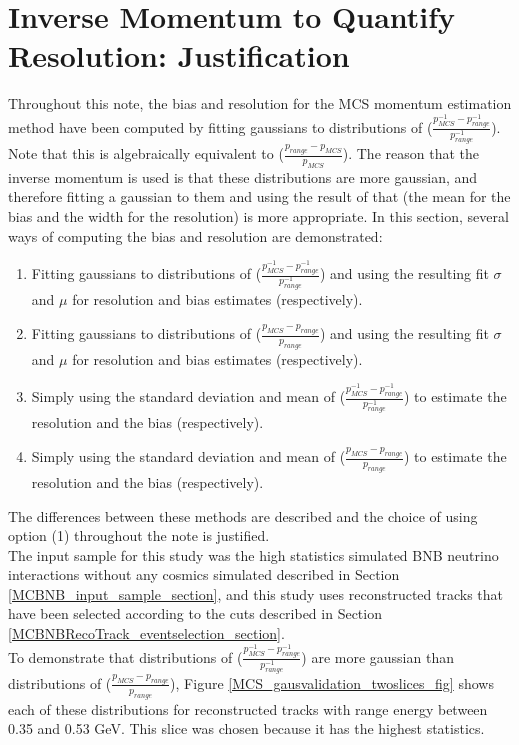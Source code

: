 \section{Inverse Momentum to Quantify Resolution: Justification}\label{inverse_p_justification_section}
Throughout this note, the bias and resolution for the MCS momentum estimation method have been computed by fitting gaussians to distributions of ($\frac{p_{MCS}^{-1} - p_{range}^{-1}}{p_{range}^{-1}}$). Note that this is algebraically equivalent to ($\frac{p_{range} - p_{MCS}}{p_{MCS}}$). The reason that the inverse momentum is used is that these distributions are more gaussian, and therefore fitting a gaussian to them and using the result of that (the mean for the bias and the width for the resolution) is more appropriate. In this section, several ways of computing the bias and resolution are demonstrated:
\begin{enumerate}
	\item Fitting gaussians to distributions of ($\frac{p_{MCS}^{-1} - p_{range}^{-1}}{p_{range}^{-1}}$) and using the resulting fit $\sigma$ and $\mu$ for resolution and bias estimates (respectively).
	\item Fitting gaussians to distributions of ($\frac{p_{MCS} - p_{range}}{p_{range}}$) and using the resulting fit $\sigma$ and $\mu$ for resolution and bias estimates (respectively).
	\item Simply using the standard deviation and mean of ($\frac{p_{MCS}^{-1} - p_{range}^{-1}}{p_{range}^{-1}}$) to estimate the resolution and the bias (respectively).
	\item Simply using the standard deviation and mean of ($\frac{p_{MCS} - p_{range}}{p_{range}}$) to estimate the resolution and the bias (respectively).
\end{enumerate}
The differences between these methods are described and the choice of using option (1) throughout the note is justified.\\



The input sample for this study was the high statistics simulated BNB neutrino interactions without any cosmics simulated described in Section \ref{MCBNB_input_sample_section}, and this study uses reconstructed tracks that have been selected according to the cuts described in Section \ref{MCBNBRecoTrack_eventselection_section}.\\

To demonstrate that distributions of ($\frac{p_{MCS}^{-1} - p_{range}^{-1}}{p_{range}^{-1}}$) are more gaussian than distributions of ($\frac{p_{MCS} - p_{range}}{p_{range}}$), Figure \ref{MCS_gausvalidation_twoslices_fig} shows each of these distributions for reconstructed tracks with range energy between 0.35 and 0.53 GeV. This slice was chosen because it has the highest statistics.\\

